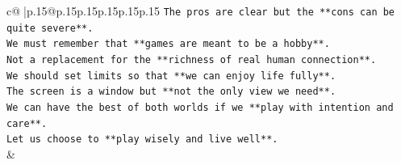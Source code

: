 \documentclass{article}
\begin{document}
{\begin{supertabular}{c@{$\;$}|p{.15\linewidth}@{}p{.15\linewidth}p{.15\linewidth}p{.15\linewidth}p{.15\linewidth}p{.15\linewidth}}
{{{\texttt{The pros are clear but the **cons can be quite severe**.} \\
\texttt{We must remember that **games are meant to be a hobby**.} \\
\texttt{Not a replacement for the **richness of real human connection**.} \\
\texttt{We should set limits so that **we can enjoy life fully**.} \\
\texttt{The screen is a window but **not the only view we need**.} \\
\texttt{We can have the best of both worlds if we **play with intention and care**.} \\
\texttt{Let us choose to **play wisely and live well**.} \\
            }
        }
    }
    & \\ \\


\end{supertabular}}
\end{document}
